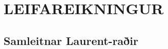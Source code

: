 \newenvironment{se}{\begin{setning+}\sl}{\hfill$\square$\end{setning+}\rm}
\newenvironment{sex}{\begin{setning+}\sl}{\hfill$\blacksquare$\end{setning+}\rm}
\newenvironment{sk}{\begin{skilgreining+}\rm}{\hfill$\square$\end{skilgreining+}\rm}
\newenvironment{sesk}{\begin{setningogskilgreining+}\rm}{\hfill$\square$\end{setningogskilgreining+}\rm}
\newenvironment{hs}{\begin{hjalparsetning+}\sl}{\hfill$\square$\end{hjalparsetning+}\rm}
\newenvironment{fs}{\begin{fylgisetning+}\sl}{\hfill$\square$\end{fylgisetning+}\rm}
\newenvironment{sy}{\begin{synidaemi+}\rm}{\hfill$\square$\end{synidaemi+}\rm}
\newenvironment{fo}{\begin{forrit+}\rm}{\hfill\end{forrit+}\rm}
\newenvironment{so}{\medbreak\noindent{\it Sönnun:}\rm}{\hfill$\blacksquare$\rm}
\newenvironment{sotx}[1]{\medbreak\noindent{\it #1:}\rm}{\hfill$\blacksquare$\rm}
\newcommand{\aefing}{\section{Æfingardæmi} \setcounter{daemateljari}{1}}
\newcommand{\daemi}{
{\medskip\noindent{\bf \thedaemateljari.}}
\addtocounter{daemateljari}{1}
}

\def\svar#1{\smallskip\noindent{\bf #1.} \ }
\def\lausn#1{\smallskip\noindent{\bf #1.} \ }
\def\ugrein#1{\medbreak\noindent{\bf #1.} }
\newcommand{\samantekt}{\noindent{\bf Samantekt.} }

\chapter {LEIFAREIKNINGUR}
 

\section{Samleitnar Laurent-raðir}  

